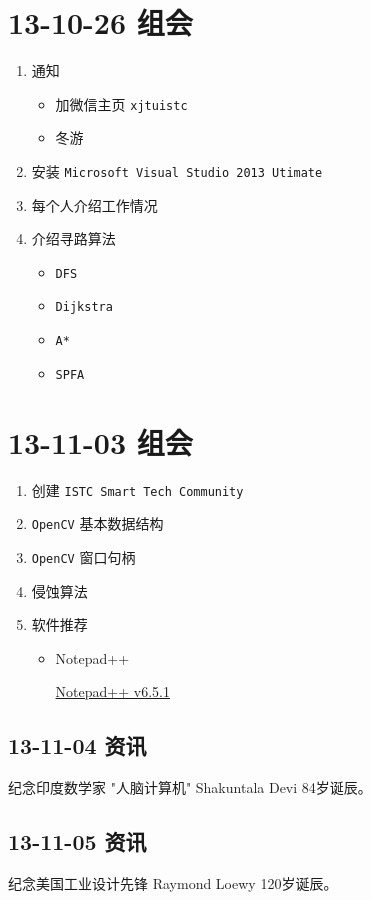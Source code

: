 \documentclass[]{report}
\begin{document}
\section{13-10-26 组会}
\begin{enumerate}
	\item 通知
	\begin{itemize}
		\item 加微信主页 \verb|xjtuistc|
		\item 冬游
	\end{itemize}
	\item 安装 \verb|Microsoft Visual Studio 2013 Utimate|
	\item 每个人介绍工作情况
	\item 介绍寻路算法
	\begin{itemize}
		\item \verb|DFS|
		\item \verb|Dijkstra|
		\item \verb|A*|
		\item \verb|SPFA|
	\end{itemize}
\end{enumerate}

\section{13-11-03 组会}
\begin{enumerate}
	\item 创建 \verb|ISTC Smart Tech Community|
	\item \verb|OpenCV| 基本数据结构
	
	\item \verb|OpenCV| 窗口句柄
	\item 侵蚀算法
	\item 软件推荐 
	\begin{itemize}
	\item Notepad++
		
	\href{http://notepad-plus-plus.org/zh/download/v6.5.1.html}{Notepad++ v6.5.1}
	\end{itemize}
	
\end{enumerate}
	\subsection{13-11-04 资讯}
		纪念印度数学家 "人脑计算机" Shakuntala Devi 84岁诞辰。
	\subsection{13-11-05 资讯}
		纪念美国工业设计先锋 Raymond Loewy 120岁诞辰。
		
\end{document}
